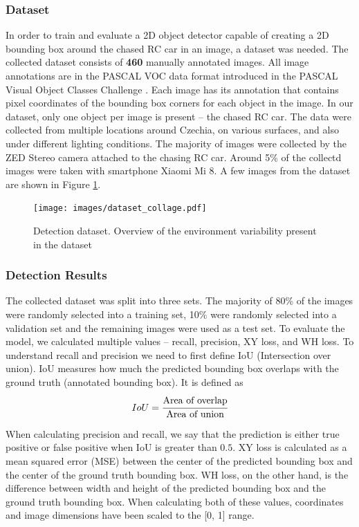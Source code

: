 \documentclass{ctuthesis/ctuthesis}
\begin{document}
\subsubsection{Dataset} \label{s:detection_dataset}
In order to train and evaluate a 2D object detector capable of creating a 2D bounding box around the chased RC car in an image, a dataset was needed. The collected dataset consists of \textbf{460} manually annotated images. All image annotations are in the PASCAL VOC data format introduced in the PASCAL Visual Object Classes Challenge \cite{pascal-voc}. Each image has its annotation that contains pixel coordinates of the bounding box corners for each object in the image. In our dataset, only one object per image is present -- the chased RC car. The data were collected from multiple locations around Czechia, on various surfaces, and also under different lighting conditions. The majority of images were collected by the ZED Stereo camera attached to the chasing RC car. Around 5\% of the collectd images were taken with smartphone Xiaomi Mi 8. A few images from the dataset are shown in Figure \ref{f:dataset_detection}.

\begin{figure}[]
    \centering
    \texttt{[image: images/dataset\_collage.pdf]}
    
    \caption{Detection dataset. Overview of the environment variability present in the dataset}\label{f:dataset_detection}
\end{figure}


\subsubsection{Detection Results}
The collected dataset was split into three sets. The majority of 80\% of the images were randomly selected into a training set, 10\% were randomly selected into a validation set and the remaining images were used as a test set. To evaluate the model, we calculated multiple values -- recall, precision, XY loss, and WH loss. To understand recall and precision we need to first define IoU (Intersection over union). IoU measures how much the predicted bounding box overlaps with the ground truth (annotated bounding box). It is defined as 
\begin{equation}IoU = \cfrac{\textrm{Area of overlap}}{\textrm{Area of union}}\end{equation}

When calculating precision and recall, we say that the prediction is either true positive or false positive when IoU is greater than $0.5$. XY loss is calculated as a mean squared error (MSE) between the center of the predicted bounding box and the center of the ground truth bounding box. WH loss, on the other hand, is the difference between width and height of the predicted bounding box and the ground truth bounding box. When calculating both of these values, coordinates and image dimensions have been scaled to the [0, 1] range. \par
\end{document}
